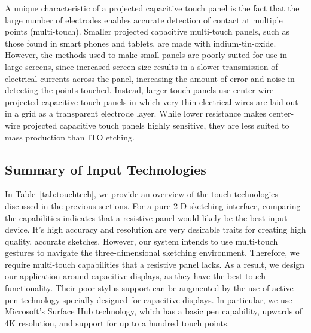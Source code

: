 A unique characteristic of a projected capacitive touch panel is the fact that the large number of electrodes enables accurate detection of contact at multiple points (multi-touch).
Smaller projected capacitive multi-touch panels, such as those found in smart phones and tablets, are made with indium-tin-oxide.
However, the methods used to make small panels are poorly suited for use in large screens, since increased screen size results in a slower transmission of electrical currents across the panel, increasing the amount of error and noise in detecting the points touched.
Instead, larger touch panels use center-wire projected capacitive touch panels in which very thin electrical wires are laid out in a grid as a transparent electrode layer.
While lower resistance makes center-wire projected capacitive touch panels highly sensitive, they are less suited to mass production than ITO etching.

\subsection{Summary of Input Technologies}

In Table~\ref{tab:touchtech}, we provide an overview of the touch technologies discussed in the previous sections.
For a pure 2-D sketching interface, comparing the capabilities indicates that a resistive panel would likely be the best input device.
It's high accuracy and resolution are very desirable traits for creating high quality, accurate sketches.
However, our system intends to use multi-touch gestures to navigate the three-dimensional sketching environment.
Therefore, we require multi-touch capabilities that a resistive panel lacks.
As a result, we design our application around capacitive displays, as they have the best touch functionality.
Their poor stylus support can be augmented by the use of active pen technology specially designed for capacitive displays.
In particular, we use Microsoft's Surface Hub technology, which has a basic pen capability, upwards of 4K resolution, and support for up to a hundred touch points.

